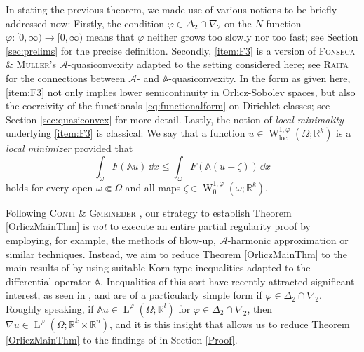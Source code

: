 \documentclass[a4paper,11pt]{amsart}
\numberwithin{equation}{section}
\newcommand{\R}{\mathbb{R}}
\newcommand{\locc}{\operatorname{loc}}
\newcommand{\lebe}{\operatorname{L}}
\newcommand{\sobo}{\operatorname{W}}
\begin{document}
	In stating the previous theorem, we made use of various notions to be briefly addressed now: Firstly, the condition $\varphi\in\Delta_{2}\cap\nabla_{2}$ on the $N$-function $\varphi\colon [0,\infty)\to[0,\infty)$ means that $\varphi$ neither grows too slowly nor too fast; see Section \ref{sec:prelims} for the precise definition. Secondly, \ref{item:F3} is a version of \textsc{Fonseca \& M\"{u}ller}'s $\mathscr{A}$-quasiconvexity \cite{FonsecaMuller} adapted to the setting considered here; see \textsc{Raita} \cite{Raita} for the connections between $\mathscr{A}$- and $\mathbb{A}$-quasiconvexity. In the form as given here, \ref{item:F3} not only implies lower semicontinuity in Orlicz-Sobolev spaces, but also the coercivity of the functionals \eqref{eq:functionalform} on Dirichlet classes; see Section \ref{sec:quasiconvex} for more detail. Lastly, the notion of \emph{local minimality} underlying \ref{item:F3} is classical: We say that a function $u\in\sobo_{\locc}^{1,\varphi}(\Omega; {\mathbb{R}^k})$ is a \emph{local minimizer} provided that 
	\begin{equation*}
		\int_\omega F(\mathbb{A}u) \, \dd{x} \leq \int_\omega F(\mathbb{A}(u+\zeta)) \, \dd{x}
	\end{equation*}
	holds for every open ${\omega} \Subset \Omega$ and all maps $\zeta \in \sobo_{0}^{1,\varphi}(\omega; {\mathbb{R}^k})$.
	
	Following \textsc{Conti \& Gmeineder} \cite{contiFXG}, our strategy to establish Theorem \ref{OrliczMainThm} is \emph{not} to execute an entire partial regularity proof by employing, for example, the methods of blow-up, $\mathcal{A}$-harmonic approximation or similar techniques. Instead, we aim to reduce Theorem \ref{OrliczMainThm} to the main results of \cite{diening_partial_2012,Irving2021partial} by using suitable Korn-type inequalities adapted to the differential operator $\mathbb{A}$. Inequalities of this sort have recently attracted significant interest, as seen in  \cite{breit_trace-free_2017, breit_sharp_2012}, and are of a particularly simple form if $\varphi\in\Delta_{2}\cap\nabla_{2}$. Roughly speaking, if $\mathbb{A}u\in\lebe^{\varphi}(\Omega;{\mathbb{R}^l})$ for $\varphi\in\Delta_{2}\cap\nabla_{2}$, then $\nabla u\in\lebe^{\varphi}(\Omega;{\mathbb{R}^k}\times\R^{n})$, and it is this insight that allows us to reduce Theorem \ref{OrliczMainThm} to the findings of \cite{diening_partial_2012,Irving2021partial} in Section \ref{Proof}. 
	
\end{document}
